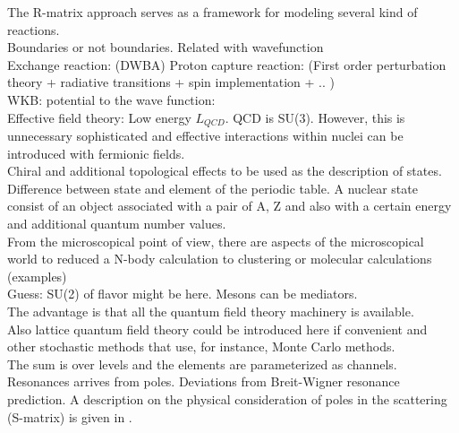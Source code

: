 \documentclass[openany]{book}
\begin{document}
The R-matrix approach serves as a framework for modeling several kind of reactions.  \\

Boundaries or not boundaries. Related with wavefunction  \\

Exchange reaction: (DWBA)
Proton capture reaction: (First order perturbation theory + radiative transitions + spin implementation + .. ) \\

WKB: potential to the wave function: \\

Effective field theory: Low energy $L_{QCD}$. 
QCD is SU(3). However, this is unnecessary sophisticated and effective interactions within nuclei can be introduced with fermionic fields.  \\

Chiral and additional topological effects to be used as the description of states. \\
 
Difference between state and element of the periodic table. A nuclear state consist of an object associated with a pair of A, Z and also  with a certain energy and additional quantum number values. \\

From the microscopical point of view, there are aspects of the microscopical world to reduced a N-body calculation to  clustering or molecular calculations (examples) \\

Guess: SU(2) of flavor might be here. Mesons can be mediators. \\

The advantage is that all the quantum field theory machinery is available. \\

Also lattice quantum field theory could be introduced here if convenient and other stochastic methods that use, for instance, Monte Carlo methods. \\

The sum is over levels and the elements are parameterized as channels.  \\

Resonances arrives from poles. Deviations from Breit-Wigner resonance prediction. A description on the physical consideration of poles in the scattering (S-matrix) is given in \cite{ramirezjimenez_kelkar_2018}. \\
\end{document}
